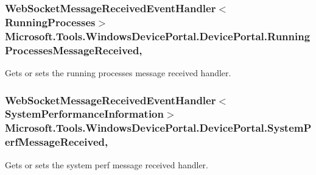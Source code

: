 \subsubsection[{\texorpdfstring{Running\+Processes\+Message\+Received}{RunningProcessesMessageReceived}}]{\setlength{\rightskip}{0pt plus 5cm}Web\+Socket\+Message\+Received\+Event\+Handler$<${\bf Running\+Processes}$>$ Microsoft.\+Tools.\+Windows\+Device\+Portal.\+Device\+Portal.\+Running\+Processes\+Message\+Received\hspace{0.3cm}{\ttfamily [get]}, {\ttfamily [set]}}\hypertarget{class_microsoft_1_1_tools_1_1_windows_device_portal_1_1_device_portal_a89511b52daa5ca50cfff9f748bfa3959}{}\label{class_microsoft_1_1_tools_1_1_windows_device_portal_1_1_device_portal_a89511b52daa5ca50cfff9f748bfa3959}


Gets or sets the running processes message received handler. 

\subsubsection[{\texorpdfstring{System\+Perf\+Message\+Received}{SystemPerfMessageReceived}}]{\setlength{\rightskip}{0pt plus 5cm}Web\+Socket\+Message\+Received\+Event\+Handler$<${\bf System\+Performance\+Information}$>$ Microsoft.\+Tools.\+Windows\+Device\+Portal.\+Device\+Portal.\+System\+Perf\+Message\+Received\hspace{0.3cm}{\ttfamily [get]}, {\ttfamily [set]}}\hypertarget{class_microsoft_1_1_tools_1_1_windows_device_portal_1_1_device_portal_a631054e4696dcd542ce9ac5a46a2441d}{}\label{class_microsoft_1_1_tools_1_1_windows_device_portal_1_1_device_portal_a631054e4696dcd542ce9ac5a46a2441d}


Gets or sets the system perf message received handler. 



